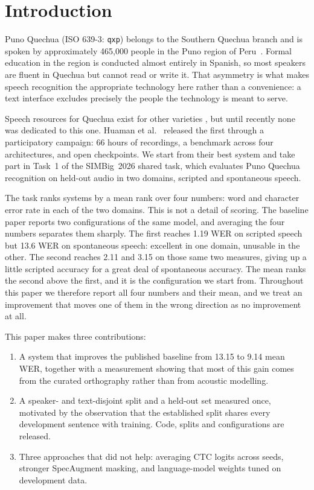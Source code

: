 \section{Introduction}
\label{sec:intro}

Puno Quechua (ISO 639-3: \texttt{qxp}) belongs to the Southern Quechua branch
and is spoken by approximately 465{,}000 people in the Puno region of
Peru~\cite{huaman2026punoasr}. Formal education in the region is conducted
almost entirely in Spanish, so most speakers are fluent in Quechua but cannot
read or write it. That asymmetry is what makes speech recognition the
appropriate technology here rather than a convenience: a text interface
excludes precisely the people the technology is meant to serve.

Speech resources for Quechua exist for other varieties
\cite{cardenas2018siminchik,paccotacya2022collao}, but until recently none was
dedicated to this one. Huaman et
al.~\cite{huaman2026punoasr} released the first through a participatory
campaign: 66 hours of recordings, a benchmark across four architectures, and
open checkpoints. We start from their best system and take part in Task~1 of
the SIMBig~2026 shared task, which evaluates Puno Quechua recognition on
held-out audio in two domains, scripted and spontaneous speech.

The task ranks systems by a mean rank over four numbers: word and
character error rate in each of the two domains. This is not a detail of
scoring. The baseline paper reports two configurations of the same model, and
averaging the four numbers separates them sharply. The first reaches 1.19 WER
on scripted speech but 13.6 WER on spontaneous speech: excellent in one domain,
unusable in the other. The second reaches 2.11 and 3.15 on those same two
measures, giving up a little scripted accuracy for a great deal of spontaneous
accuracy. The mean ranks the second above the first, and it is the
configuration we start from. Throughout this paper we therefore report all
four numbers and their mean, and we treat an improvement that moves one of them
in the wrong direction as no improvement at all.

This paper makes three contributions:

\begin{enumerate}
  \item A system that improves the published baseline from 13.15 to 9.14 mean
        WER, together with a measurement showing that most of this gain comes
        from the curated orthography rather than from acoustic modelling.
  \item A speaker- and text-disjoint split and a held-out set measured once,
        motivated by the observation that the established split shares every
        development sentence with training. Code, splits and configurations
        are released.
  \item Three approaches that did not help: averaging CTC logits across seeds,
        stronger SpecAugment masking, and language-model weights tuned on
        development data.
\end{enumerate}

